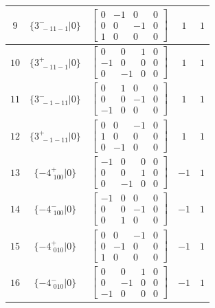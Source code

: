 \documentclass[fleqn,8pt]{jsarticle}
\begin{document}
\begin{longtable}{ccccc}
$ 9 $ & $ \{3^{-}_{\,\,-11-1}|0\} $ & $ \begin{bmatrix} 0 & -1 & 0 & 0 \\ 0 & 0 & -1 & 0 \\ 1 & 0 & 0 & 0 \end{bmatrix} $ & $ 1 $ & $ 1 $ \\ \hline
$ 10 $ & $ \{3^{+}_{\,\,-11-1}|0\} $ & $ \begin{bmatrix} 0 & 0 & 1 & 0 \\ -1 & 0 & 0 & 0 \\ 0 & -1 & 0 & 0 \end{bmatrix} $ & $ 1 $ & $ 1 $ \\ \hline
$ 11 $ & $ \{3^{-}_{\,\,-1-11}|0\} $ & $ \begin{bmatrix} 0 & 1 & 0 & 0 \\ 0 & 0 & -1 & 0 \\ -1 & 0 & 0 & 0 \end{bmatrix} $ & $ 1 $ & $ 1 $ \\ \hline
$ 12 $ & $ \{3^{+}_{\,\,-1-11}|0\} $ & $ \begin{bmatrix} 0 & 0 & -1 & 0 \\ 1 & 0 & 0 & 0 \\ 0 & -1 & 0 & 0 \end{bmatrix} $ & $ 1 $ & $ 1 $ \\ \hline
$ 13 $ & $ \{-4^{+}_{\,\,100}|0\} $ & $ \begin{bmatrix} -1 & 0 & 0 & 0 \\ 0 & 0 & 1 & 0 \\ 0 & -1 & 0 & 0 \end{bmatrix} $ & $ -1 $ & $ 1 $ \\ \hline
$ 14 $ & $ \{-4^{-}_{\,\,100}|0\} $ & $ \begin{bmatrix} -1 & 0 & 0 & 0 \\ 0 & 0 & -1 & 0 \\ 0 & 1 & 0 & 0 \end{bmatrix} $ & $ -1 $ & $ 1 $ \\ \hline
$ 15 $ & $ \{-4^{+}_{\,\,010}|0\} $ & $ \begin{bmatrix} 0 & 0 & -1 & 0 \\ 0 & -1 & 0 & 0 \\ 1 & 0 & 0 & 0 \end{bmatrix} $ & $ -1 $ & $ 1 $ \\ \hline
$ 16 $ & $ \{-4^{-}_{\,\,010}|0\} $ & $ \begin{bmatrix} 0 & 0 & 1 & 0 \\ 0 & -1 & 0 & 0 \\ -1 & 0 & 0 & 0 \end{bmatrix} $ & $ -1 $ & $ 1 $ \\ \hline

\end{longtable}
\end{document}

